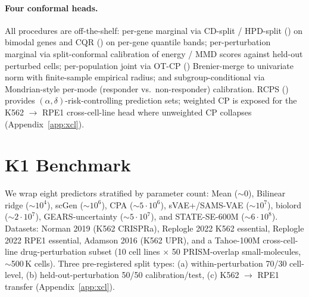 \documentclass{article}
\begin{document}
\paragraph{Four conformal heads.}
All procedures are off-the-shelf: per-gene marginal via CD-split / HPD-split (\citet{izbicki2022}) on bimodal genes and CQR (\citet{romano2019}) on per-gene quantile bands; per-perturbation marginal via split-conformal calibration of energy / MMD scores against held-out perturbed cells; per-population joint via OT-CP (\citet{otcp2025}) Brenier-merge to univariate norm with finite-sample empirical radius; and subgroup-conditional via \citet{cauchois2021} Mondrian-style per-mode (responder vs.\ non-responder) calibration. RCPS (\citet{bates2021}) provides $(\alpha, \delta)$-risk-controlling prediction sets; \citet{tibshirani2019} weighted CP is exposed for the K562 $\rightarrow$ RPE1 cross-cell-line head where unweighted CP collapses (Appendix~\ref{app:xcl}).

\section{K1 Benchmark}

We wrap eight predictors stratified by parameter count: Mean ($\sim 0$), Bilinear ridge ($\sim 10^4$), scGen ($\sim 10^6$), CPA ($\sim 5 \cdot 10^6$), sVAE+/SAMS-VAE ($\sim 10^7$), biolord ($\sim 2 \cdot 10^7$), GEARS-uncertainty ($\sim 5 \cdot 10^7$), and STATE-SE-600M ($\sim 6 \cdot 10^8$). Datasets: Norman 2019 (K562 CRISPRa), Replogle 2022 K562 essential, Replogle 2022 RPE1 essential, Adamson 2016 (K562 UPR), and a Tahoe-100M \citep{tahoe2025} cross-cell-line drug-perturbation subset (10 cell lines $\times$ 50 PRISM-overlap small-molecules, $\sim$500\,K cells). Three pre-registered split types: (a) within-perturbation 70/30 cell-level, (b) held-out-perturbation 50/50 calibration/test, (c) K562 $\rightarrow$ RPE1 transfer (Appendix~\ref{app:xcl}).
\end{document}
